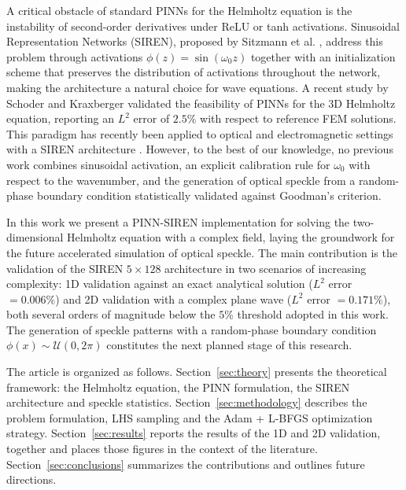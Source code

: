 A critical obstacle of standard PINNs for the Helmholtz equation is the
instability of second-order derivatives under ReLU or tanh activations.
Sinusoidal Representation Networks (SIREN), proposed by Sitzmann et al.
\cite{Sitzmann2020_SIREN}, address this problem through activations
$\phi(z) = \sin(\omega_0 z)$ together with an initialization scheme that preserves
the distribution of activations throughout the network, making the architecture a
natural choice for wave equations.
A recent study by Schoder and Kraxberger \cite{Schoder2024_PINN_acoustics}
validated the feasibility of PINNs for the 3D Helmholtz equation, reporting an
$L^2$ error of $2.5\%$ with respect to reference FEM solutions.
This paradigm has recently been applied to optical and electromagnetic settings
with a SIREN architecture \cite{Panagiotakopoulos2026_Helmholtz}.
However, to the best of our knowledge, no previous work combines sinusoidal
activation, an explicit calibration rule for $\omega_0$ with respect to the
wavenumber, and the generation of optical speckle from a random-phase boundary
condition statistically validated against Goodman's criterion.

In this work we present a PINN-SIREN implementation for solving the
two-dimensional Helmholtz equation with a complex field, laying the groundwork for
the future accelerated simulation of optical speckle.
The main contribution is the validation of the SIREN $5\times128$ architecture in
two scenarios of increasing complexity: 1D validation against an exact analytical
solution ($L^2$ error $= 0.006\%$) and 2D validation with a complex plane wave
($L^2$ error $= 0.171\%$), both several orders of magnitude below the $5\%$
threshold adopted in this work.
The generation of speckle patterns with a random-phase boundary condition
$\phi(x) \sim \mathcal{U}(0, 2\pi)$ constitutes the next planned stage of this
research.

The article is organized as follows.
Section~\ref{sec:theory} presents the theoretical framework: the Helmholtz
equation, the PINN formulation, the SIREN architecture and speckle statistics.
Section~\ref{sec:methodology} describes the problem formulation, LHS sampling and
the Adam + L-BFGS optimization strategy.
Section~\ref{sec:results} reports the results of the 1D and 2D validation, together
and places those figures in the context of the literature.
Section~\ref{sec:conclusions} summarizes the contributions and outlines future
directions.
